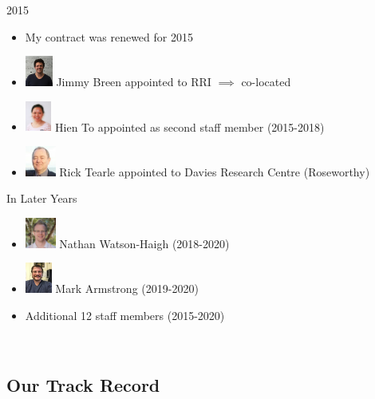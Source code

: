 \documentclass[11pt]{beamer}
\begin{document}
\begin{frame}{2015}

	\begin{itemize}
		\item My contract was renewed for 2015
		\item \includegraphics[height=1cm]{figures/Jimmy.jpg} Jimmy Breen appointed to RRI $\implies$ co-located
		\item \includegraphics[height=1cm]{figures/hien.jpg} Hien To appointed as second staff member (2015-2018)
		\item \includegraphics[height=1cm]{figures/rick.jpeg} Rick Tearle appointed to Davies Research Centre (Roseworthy)\\[8mm]
	\end{itemize}		
	
\end{frame}

\begin{frame}{In Later Years}

	\begin{itemize}
		\item \includegraphics[height=1cm]{figures/Watson-Haigh.jpeg} Nathan Watson-Haigh (2018-2020) 
		\item \includegraphics[height=1cm]{figures/Mark.jpg}  Mark Armstrong (2019-2020)
		\item Additional 12 staff members (2015-2020)
	\end{itemize}
	~\\[1cm]
	
\end{frame}


\subsection{Our Track Record}
\end{document}
